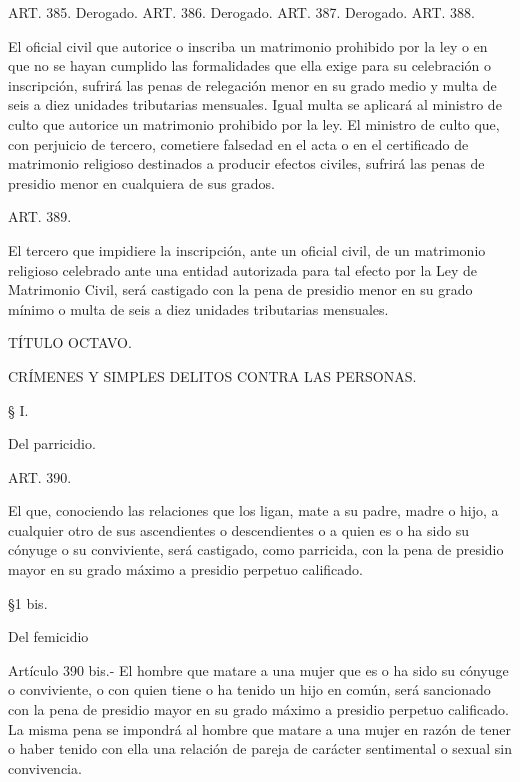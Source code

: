     ART. 385. Derogado.
    ART. 386. Derogado.
    ART. 387. Derogado.
    ART. 388.

    El oficial civil que autorice o inscriba un matrimonio prohibido por la ley o en que no se hayan cumplido las formalidades que ella exige para su celebración o inscripción, sufrirá las penas de relegación menor en su grado medio y multa de seis a diez unidades tributarias mensuales. Igual multa se aplicará al ministro de culto que autorice un matrimonio prohibido por la ley.
    El ministro de culto que, con perjuicio de tercero, cometiere falsedad en el acta o en el certificado de matrimonio religioso destinados a producir efectos civiles, sufrirá las penas de presidio menor en cualquiera de sus grados.


    ART. 389.

    El tercero que impidiere la inscripción, ante un oficial civil, de un matrimonio religioso celebrado ante una entidad autorizada para tal efecto por la Ley de Matrimonio Civil, será castigado con la pena de presidio menor en su grado mínimo o multa de seis a diez unidades tributarias mensuales.


    TÍTULO OCTAVO.
   
    CRÍMENES Y SIMPLES DELITOS CONTRA LAS PERSONAS.
   





    § I.

    Del parricidio.






    ART. 390.

    El que, conociendo las relaciones que los ligan, mate a su padre, madre o hijo, a cualquier otro de sus ascendientes o descendientes o a quien es o ha sido su cónyuge o su conviviente, será castigado, como parricida, con la pena de presidio mayor en su grado máximo a presidio perpetuo calificado.

    §1 bis.

    Del femicidio
     


    Artículo 390 bis.- El hombre que matare a una mujer que es o ha sido su cónyuge o conviviente, o con quien tiene o ha tenido un hijo en común, será sancionado con la pena de presidio mayor en su grado máximo a presidio perpetuo calificado.
    La misma pena se impondrá al hombre que matare a una mujer en razón de tener o haber tenido con ella una relación de pareja de carácter sentimental o sexual sin convivencia.
     
